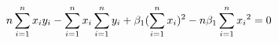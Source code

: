 \documentclass[preview]{standalone}
\begin{document}
\begin{align*}
\special{dvisvgm:raw <g id='unique000'>}n\sum_{i=1}^n{x_i y_i}-\sum_{i=1}^n{x_i}\sum_{i=1}^n{y_i}+\beta_1(\sum_{i=1}^n{x_i})^2-n\beta_1\sum_{i=1}^n{{x_i}^2}=0\special{dvisvgm:raw </g>}
\end{align*}
\end{document}
